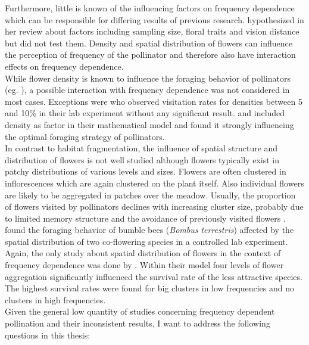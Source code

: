 Furthermore, little is known of the influencing factors on frequency dependence which can be responsible for differing results of previous research.  \cite{smithson2001pollinator} hypothesized in her review about factors including sampling size, floral traits and vision distance but did not test them. Density and spatial distribution of flowers can influence the perception of frequency of the pollinator and therefore also have interaction effects on frequency dependence.\\ 
While flower density is known to influence the foraging behavior of pollinators (eg. \citealt{kunin1993sex,essenberg2012explaining}), a possible interaction with frequency dependence was not considered in most cases. Exceptions were \cite{smithson1997density} who observed visitation rates for densities between 5 and 10\% in their lab experiment without any significant result. \cite{kunin1996pollinator} and \cite{song2014adaptive}  included density as factor in their mathematical model and found it strongly influencing the optimal foraging strategy of pollinators.\\

In contrast to habitat fragmentation, the influence of spatial structure and distribution of flowers is not well studied although flowers typically exist in patchy distributions of various levels and sizes. Flowers are often clustered in inflorescences which are again clustered on the plant itself. Also individual flowers are likely to be aggregated in patches over the meadow. Usually, the proportion of flowers visited by pollinators declines with increasing cluster size, probably due to limited memory structure and the avoidance of previously visited flowers \citep{goulson2000pollinators}. \cite{geslin2014effect} found the foraging behavior of bumble bees (\textit{Bombus terrestris}) affected by the spatial distribution of two co-flowering species in a controlled lab experiment. Again, the only study about spatial distribution of flowers in the context of frequency dependence was done by \cite{hanoteaux2013effects}. Within their model four levels of flower aggregation significantly influenced the survival rate of the less attractive species. The highest survival rates were found for big clusters in low frequencies and no clusters in high frequencies.\\ 

Given the general low quantity of studies concerning frequency dependent pollination and their inconsistent results, I want to address the following questions in this thesis:

